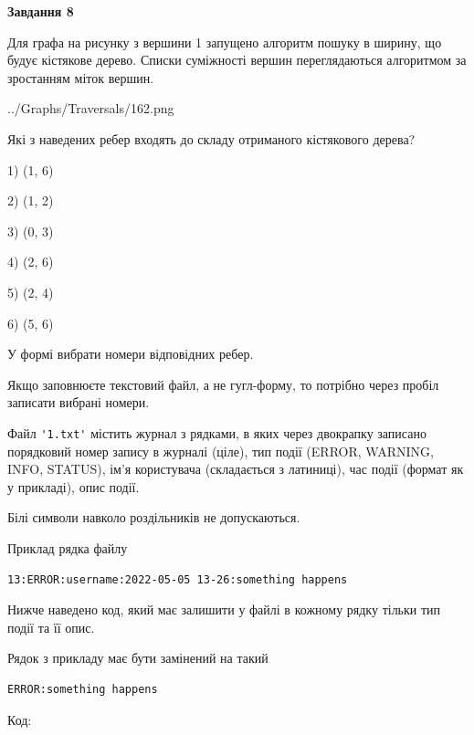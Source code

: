 \documentclass[12pt, ukrainian]{article}
\def\code#1{\Verb!#1!}
\begin{document}
{\begin {large}
{\begin {center}\textbf{Завдання 8}\end {center}}\par
Для графа на рисунку з вершини 1 запущено алгоритм пошуку в ширину, що будує кістякове дерево. Списки суміжності вершин переглядаються алгоритмом за зростанням міток вершин.\par
\begin{center}
	{../Graphs/Traversals/162.png}
\end{center}
\par Які з наведених ребер входять до складу отриманого кістякового дерева?\par
1) (1, 6)\par
2) (1, 2)\par
3) (0, 3)\par
4) (2, 6)\par
5) (2, 4)\par
6) (5, 6)\par
{\vskip 15pt} У формі вибрати номери відповідних ребер.


Якщо заповнюєте текстовий файл, а не гугл-форму, то потрібно через пробіл записа\-ти вибрані номери.\par
\newpage


Файл \code{'1.txt'} містить журнал з рядками, в яких через двокрапку записано поряд\-ко\-вий номер запису в журналі (ціле), тип події (ERROR, WARNING, INFO, STATUS), ім'я користувача (складається з латиниці), час події (фор\-мат як у прикладі), опис події.

Білі символи навколо роздільників не допускаються.

Приклад рядка файлу



\begin{verbatim}
13:ERROR:username:2022-05-05 13-26:something happens
\end{verbatim}


Нижче наведено код, який має залишити у файлі в кожному рядку тільки тип події та її опис.

Рядок з прикладу має бути замінений на такий



\begin{verbatim}
ERROR:something happens
\end{verbatim}




Код:




\end{large}}
\end{document}
